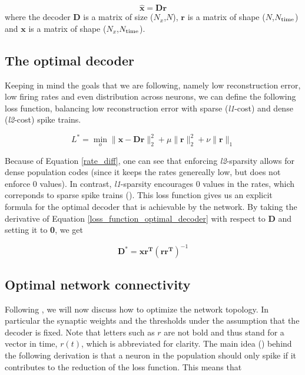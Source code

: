 \documentclass[twoside,11pt]{article}
\begin{document}
\begin{equation*}
    \mathbf{\hat{x}} = \mathbf{Dr}
\end{equation*} 
where the decoder $\mathbf{D}$ is a matrix of size ($N_x$,$N$), $\mathbf{r}$ is a matrix of shape
($N$,$N_\textnormal{time}$) and $\mathbf{x}$ is a matrix of shape ($N_x$,$N_\textnormal{time}$).

\subsection{The optimal decoder}

Keeping in mind the goals that we are following, namely low reconstruction error, low firing
rates and even distribution across neurons, we can define the following loss function, balancing
low reconstruction error with sparse (\textit{l1}-cost) and dense (\textit{l2}-cost) spike trains.

\begin{equation} \label{loss_function_optimal_decoder}
    L^* = \min_{o} \|\mathbf{x} - \mathbf{Dr}\| ^2_2 + \mu \|\mathbf{r}\|_2^2 + \nu \|\mathbf{r}\|_1
\end{equation}

Because of Equation \ref{rate_diff}, one can see that enforcing \textit{l2}-sparsity allows for
dense population codes (since it keeps the rates genereally low, but does not enforce 0 values). 
In contrast, \textit{l1}-sparsity encourages 0 values in the rates, which correponds to sparse spike trains (\cite{Tibshirani1996}).
This loss function gives us an explicit formula for the optimal decoder that is achievable by the network.
By taking the derivative of Equation \ref{loss_function_optimal_decoder} with respect to $\mathbf{D}$ and setting it to \textbf{0}, we get

\begin{equation*}
    \mathbf{D}^* = \mathbf{xr^T}(\mathbf{rr^T})^{-1}
\end{equation*}


\subsection{Optimal network connectivity}

Following \cite{wiel2017learning}, we will now discuss how to optimize the network topology.
In particular the synaptic weights and the thresholds
under the assumption that the decoder is fixed. Note that letters such as
$r$ are not bold and thus stand for a vector in time, $r(t)$, which is abbreviated for clarity.
The main idea (\cite{Bourdoukan:2012:LOS:2999325.2999390}) behind the
following derivation is that a neuron in the population should only spike if it
contributes to the reduction of the loss function.
This means that
\end{document}

